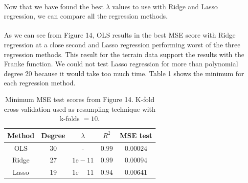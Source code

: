 \documentclass[a4paper,twocolumn]{article}
\begin{document}
\\ 
Now that we have found the best $\lambda$ values to use with Ridge and Lasso regression, we can compare all the regression methods.\\
\\
As we can see from Figure 14, OLS results in the best MSE score with Ridge regression at a close second and Lasso regression performing worst of the three regression methods. This result for the terrain data support the results with the Franke function. We could not test Lasso regression for more than polynomial degree 20 because it would take too much time. Table 1 shows the minimum for each regression method.\\
\begin{table}[h]
    \centering
    \caption{Minimum MSE test scores from Figure 14. K-fold cross validation used as resampling technique with k-folds $= 10$.}
    \begin{tabular}{|c||c|c|c|c| }
    \hline
        Method & Degree & $\lambda$ & $R^{2}$ & MSE test \\ 
        \hline\hline
        OLS & 30 & - & $0.99$ & $0.00024$ \\ 
        \hline
        Ridge & 27 & $1\textrm{e}-11$ & $0.99$ & $0.00094$ \\
        \hline
        Lasso & 19 & $1\textrm{e}-11$ & $0.94$ & $0.00641$\\
        \hline
    \end{tabular}
\end{table}
\end{document}
